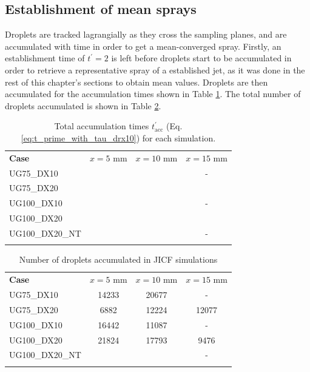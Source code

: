 \subsection{Establishment of mean sprays}

Droplets are tracked lagrangially as they cross the sampling planes, and are accumulated with time in order to get a mean-converged spray. Firstly, an establishment time of $t^{\prime} = 2$ is left before droplets start to be accumulated in order to retrieve a representative spray of a established jet, as it was done in the rest of this chapter's sections to obtain mean values. Droplets are then accumulated for the accumulation times shown in Table \ref{tab:jicf_SLI_t_prime_accumulation}. The total number of droplets accumulated is shown in Table \ref{tab:jicf_SLI_Ndr_accumulated}.

\begin{table}[!h]
\centering
\caption{Total accumulation times $t_\mathrm{acc}^{\prime}$ (Eq. \ref{eq:t_prime_with_tau_drx10}) for each simulation.}
\begin{tabular}{lccc}
\thickhline
\textbf{Case} & $x = 5$ mm & $x = 10$ mm & $x = 15$ mm  \\
\thickhline 
UG75\_DX10  &  &  & - \\
UG75\_DX20  &   &  &   \\
UG100\_DX10 &  &  & - \\
UG100\_DX20 &  &  &   \\
UG100\_DX20\_NT &  & & - \\
\thickhline
\end{tabular}
\label{tab:jicf_SLI_t_prime_accumulation}
\end{table}


\begin{table}[!h]
\centering
\caption{Number of droplets accumulated in JICF simulations}
\begin{tabular}{lccc}
\thickhline
\textbf{Case} & $x = 5$ mm & $x = 10$ mm & $x = 15$ mm  \\
\thickhline 
UG75\_DX10  & 14233 & 20677 & - \\
UG75\_DX20  &  6882 & 12224 & 12077 \\
UG100\_DX10 & 16442 & 11087 & - \\
UG100\_DX20 & 21824 & 17793 & 9476 \\
UG100\_DX20\_NT &  & & - \\
\thickhline
\end{tabular}
\label{tab:jicf_SLI_Ndr_accumulated}
\end{table}

